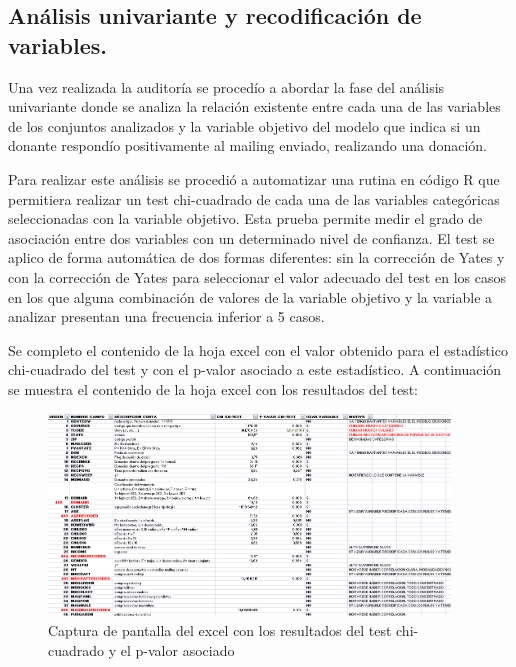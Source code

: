 \subsection{Análisis univariante y recodificación de variables.}

Una vez realizada la auditoría se procedío a abordar la fase del análisis univariante donde se analiza la relación existente entre cada una de las variables de los conjuntos analizados y la variable objetivo del modelo que indica si un donante respondío positivamente al mailing enviado, realizando una donación.

Para realizar este análisis se procedió a automatizar una rutina en código R que permitiera realizar un test chi-cuadrado de cada una de las variables categóricas seleccionadas con la variable objetivo. Esta prueba permite medir el grado de asociación entre dos variables con un determinado nivel de confianza. El test se aplico de forma automática de dos formas diferentes: sin la corrección de Yates y con la corrección de Yates para seleccionar el valor adecuado del test en los casos en los que alguna combinación de valores de la variable objetivo y la variable a analizar presentan una frecuencia inferior a 5 casos.

Se completo el contenido de la hoja excel con el valor obtenido para el estadístico chi-cuadrado del test y con el p-valor asociado a este estadístico. A continuación se muestra el contenido de la hoja excel con los resultados del test:

\begin{figure}[H]
\begin{center}
\includegraphics[width=0.95\textwidth]{img/univariante1}
\caption{Captura de pantalla del excel con los resultados del test chi-cuadrado y el p-valor asociado}
\end{center}
\end{figure}

